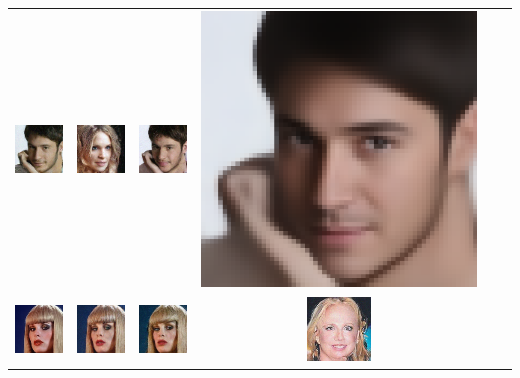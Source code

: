 \begin{table}[h!]
{\begin{tabular}{cccccc}
        \includegraphics[width=.145\textwidth]{chapter4/figures/images/celebA/corrected_reconstruction/9.png} &
        \includegraphics[width=.145\textwidth]{chapter4/figures/images/celebA/diffusion_decoder_beta_0.01/9.png} &
        \includegraphics[width=.145\textwidth]{chapter4/figures/images/celebA/diffusion_decoder_beta_0/9.png} &
        \includegraphics[width=.145\textwidth]{chapter4/figures/images/celebA/VAE_reconstruction/9.png} \\
        \includegraphics[width=.145\textwidth]{chapter4/figures/images/celebA/original/10.png} &   
        \includegraphics[width=.145\textwidth]{chapter4/figures/images/celebA/reconstruction/10.png} &
        \includegraphics[width=.145\textwidth]{chapter4/figures/images/celebA/corrected_reconstruction/10.png} &
        \includegraphics[width=.145\textwidth]{chapter4/figures/images/celebA/diffusion_decoder_beta_0.01/10.png} &

\end{tabular}}
\end{table}
